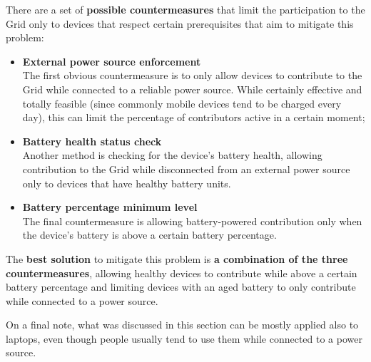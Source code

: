 There are a set of \textbf{possible countermeasures} that limit the participation to the Grid only to devices that respect certain prerequisites that aim to mitigate this problem:
\begin{itemize}
    \item \textbf{External power source enforcement}\\
    The first obvious countermeasure is to only allow devices to contribute to the Grid while connected to a reliable power source. While certainly effective and totally feasible (since commonly mobile devices tend to be charged every day), this can limit the percentage of contributors active in a certain moment;
    \item \textbf{Battery health status check}\\
    Another method is checking for the device's battery health, allowing contribution to the Grid while disconnected from an external power source only to devices that have healthy battery units.
    \item \textbf{Battery percentage minimum level}\\
    The final countermeasure is allowing battery-powered contribution only when the device's battery is above a certain battery percentage.
\end{itemize}
The \textbf{best solution} to mitigate this problem is \textbf{a combination of the three countermeasures}, allowing healthy devices to contribute while above a certain battery percentage and limiting devices with an aged battery to only contribute while connected to a power source.

On a final note, what was discussed in this section can be mostly applied also to laptops, even though people usually tend to use them while connected to a power source.

